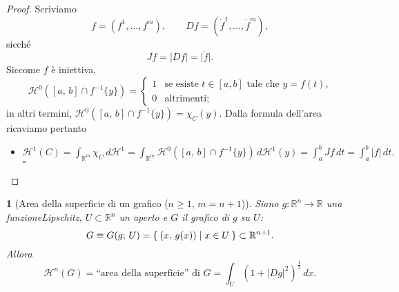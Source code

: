 \documentclass[a4paper,10pt,openright,oneside]{book}
\theoremstyle{theoremstyle}
\theoremstyle{theoremstylewoheader}
\newtheorem{teorema2}[teorema]{}
\theoremstyle{theoremstyle}
\theoremstyle{proofsecstyle}
\theoremstyle{nonumberplain}
\newtheorem{proof}{Dim.}
\newcommand{\RR}{\ensuremath{\mathbb{R}}}
\newcommand{\Haus}{\ensuremath{\mathcal{H}}}
\newcommand{\abs}[1]{\ensuremath{\lvert #1 \rvert}}
\renewcommand{\qedsymbol}{\ensuremath{\square}}
\newcommand{\mymath}[2]{\begin{itemize}%
  \item[]\hfill\hbox{}\ensuremath{\displaystyle #1}\hfill\ensuremath{\displaystyle #2}%
  \end{itemize}}
\begin{document}
\begin{proof}
Scriviamo
\[
f = (f^1, \ldots, f^m),\qquad Df = (\dot{f}^1, \ldots, \dot{f}^m),
\]
sicché
\[
Jf = \abs{Df} = \abs{\dot{f}}.
\]
Siccome $f$ è iniettiva,
\[
\Haus^0([a,\, b] \cap f^{-1}\{y\}) = \begin{cases}
1 & \text{se esiste $t \in [a,b]$ tale che $y = f(t)$,}\\
0 & \text{altrimenti;}
\end{cases}
\]
in altri termini, $\Haus^0([a,\, b] \cap f^{-1}\{y\}) = \chi_C(y)$. Dalla formula dell'area ricaviamo pertanto 
\mymath{\Haus^1(C) = \int_{\RR^m} \chi_C\, d\Haus^1 = \int_{\RR^m} \Haus^0([a,\, b] \cap f^{-1}\{y\})\, d\Haus^1(y) = \int_a^b Jf\, dt = \int_a^b \abs{\dot{f}}\, dt.}{\qedsymbol}
\end{proof}

\begin{teorema2}[Area della superficie di un grafico ($n \ge 1$, $m = n + 1$)]
\label{thm:area_superficie_grafico}
Siano $g : \RR^n \rightarrow \RR$ una funzione\linebreak Lipschitz, $U \subset \RR^n$ un aperto e $G$ il grafico di $g$ su $U$: 
\[
G \equiv G(g;\, U) = \Set{ (x,\, g(x)) | x \in U } \subset \RR^{n+1}.
\]
Allora
\[
\Haus^n(G) = \text{``area della superficie'' di $G$} = \int_U (1 + \abs{Dg}^2)^{\frac{1}{2}}\, dx.
\]
\end{teorema2}
\end{document}
